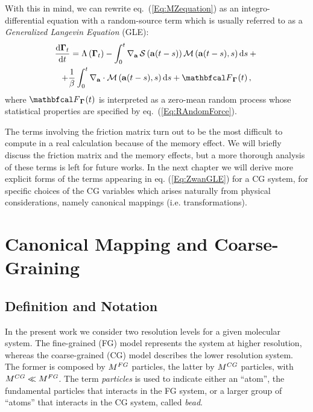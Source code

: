 \documentclass[10pt,a4paper]{book}
\theoremstyle{definition}
\begin{document}
With this in mind, we can rewrite eq.~(\ref{Eq:MZequation}) as an integro-differential equation with a random-source term which is usually referred to as a \emph{Generalized Langevin Equation} (GLE):
\begin{multline}\label{Eq:ZwanGLE}
 \totd{\Bphase{t}}{t} = \Lambda\cip{\Bphase{t}} 
    - \int_0^t \nabla_{\bfa}\,\entropy\cip{\bfa(t-s)}\fricmat\cip{\bfa(t-s),s} \diff s +{}\\
    + \frac{1}{\beta}\int_0^t \nabla_{\bfa}\cdot\fricmat\cip{\bfa(t-s),s} \diff s + \fprojbf_{\Bphase{}}(t)\,, 
\end{multline}
where $\fprojbf_{\Bphase{}}(t)$ is interpreted as a zero-mean random process whose statistical properties are specified by eq.~(\ref{Eq:RAndomForce}).

The terms involving the friction matrix turn out to be the most difficult to compute in a real calculation because of the memory effect. We will briefly discuss the friction matrix and the memory effects, but a more thorough analysis of these terms is left for future works. 
In the next chapter we will derive more explicit forms of the terms appearing in eq. (\ref{Eq:ZwanGLE}) for a CG system, for specific choices of the CG variables which arises naturally from physical considerations, namely canonical mappings (i.e. transformations).


\chapter{Canonical Mapping and Coarse-Graining}
\label{Sec:CanMapp&CG}

\section{Definition and Notation}
In the present work we consider two resolution levels for a given molecular system. 
The fine-grained (FG) model represents the system at higher resolution, whereas the coarse-grained (CG) model describes the lower resolution system. The former is composed by $M^{FG}$ particles, the latter by $M^{CG}$ particles, with $M^{CG} \ll M^{FG} $.
The term \emph{particles} is used to indicate either an ``atom'', the fundamental particles that interacts in the FG system, or a larger group of ``atoms'' that interacts in the CG system, called \emph{bead}.
\end{document}
